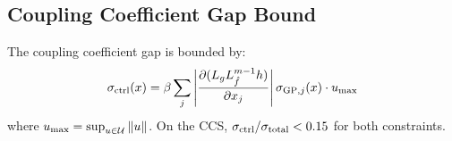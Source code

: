\subsection{Coupling Coefficient Gap Bound}

The coupling coefficient gap is bounded by:
\begin{equation}
    \sigma_{\mathrm{ctrl}}(x) = \beta \sum_{j} \left|\frac{\partial (L_g L_{\hat{f}}^{m-1} h)}{\partial x_j}\right| \sigma_{\mathrm{GP},j}(x) \cdot u_{\max}
    \label{eq:sigma_ctrl_app}
\end{equation}
where $u_{\max} = \sup_{u \in \mathcal{U}} \|u\|$. On the CCS, $\sigma_{\mathrm{ctrl}} / \sigma_{\mathrm{total}} < 0.15$ for both constraints.